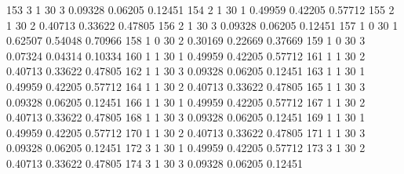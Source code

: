 \documentclass{article}
\begin{document}
\begin{Woutput}
 153      3       1      30       3       0.09328    0.06205    0.12451
 154      2       1      30       1       0.49959    0.42205    0.57712
 155      2       1      30       2       0.40713    0.33622    0.47805
 156      2       1      30       3       0.09328    0.06205    0.12451
 157      1       0      30       1       0.62507    0.54048    0.70966
 158      1       0      30       2       0.30169    0.22669    0.37669
 159      1       0      30       3       0.07324    0.04314    0.10334
 160      1       1      30       1       0.49959    0.42205    0.57712
 161      1       1      30       2       0.40713    0.33622    0.47805
 162      1       1      30       3       0.09328    0.06205    0.12451
 163      1       1      30       1       0.49959    0.42205    0.57712
 164      1       1      30       2       0.40713    0.33622    0.47805
 165      1       1      30       3       0.09328    0.06205    0.12451
 166      1       1      30       1       0.49959    0.42205    0.57712
 167      1       1      30       2       0.40713    0.33622    0.47805
 168      1       1      30       3       0.09328    0.06205    0.12451
 169      1       1      30       1       0.49959    0.42205    0.57712
 170      1       1      30       2       0.40713    0.33622    0.47805
 171      1       1      30       3       0.09328    0.06205    0.12451
 172      3       1      30       1       0.49959    0.42205    0.57712
 173      3       1      30       2       0.40713    0.33622    0.47805
 174      3       1      30       3       0.09328    0.06205    0.12451


\end{Woutput}
\end{document}
